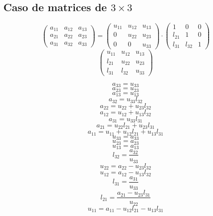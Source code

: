\documentclass[10pt,a4paper,dvipdfmx]{article}
\begin{document}
\subsection{Caso de matrices de $3\times 3$ }
$$ \left( 
\begin{array}{ccc}
a_{{1}{1}} & a_{{1}{2}} & a_{{1}{3}} \\
a_{{2}{1}} & a_{{2}{2}} & a_{{2}{3}} \\
a_{{3}{1}} & a_{{3}{2}} & a_{{3}{3}} 
 \end{array}
\right)
 = \left( 
\begin{array}{ccc}
u_{{1}{1}} & u_{{1}{2}} & u_{{1}{3}} \\
0 & u_{{2}{2}} & u_{{2}{3}} \\
0 & 0 & u_{{3}{3}} 
 \end{array}
\right)
 \cdot \left( 
\begin{array}{ccc}
1 & 0 & 0 \\
l_{{2}{1}} & 1 & 0 \\
l_{{3}{1}} & l_{{3}{2}} & 1 
 \end{array}
\right)
 $$
$$ \left( 
\begin{array}{ccc}
u_{{1}{1}} & u_{{1}{2}} & u_{{1}{3}} \\
l_{{2}{1}} & u_{{2}{2}} & u_{{2}{3}} \\
l_{{3}{1}} & l_{{3}{2}} & u_{{3}{3}} 
 \end{array}
\right)
 $$
\begin{multicols}{2}
$$ a_{{3}{3}} = u_{{3}{3}} $$
$$ a_{{2}{3}} = u_{{2}{3}} $$
$$ a_{{1}{3}} = u_{{1}{3}} $$
$$ a_{{3}{2}} = u_{{3}{3}} l_{{3}{2}} $$
$$ a_{{2}{2}} = u_{{2}{2}} + u_{{2}{3}} l_{{3}{2}} $$
$$ a_{{1}{2}} = u_{{1}{2}} + u_{{1}{3}} l_{{3}{2}} $$
$$ a_{{3}{1}} = u_{{3}{3}} l_{{3}{1}} $$
$$ a_{{2}{1}} = u_{{2}{2}} l_{{2}{1}} + u_{{2}{3}} l_{{3}{1}} $$
$$ a_{{1}{1}} = u_{{1}{1}} + u_{{1}{2}} l_{{2}{1}} + u_{{1}{3}} l_{{3}{1}} $$
\vfill\null
\columnbreak
$$ u_{{3}{3}} = a_{{3}{3}} $$
$$ u_{{2}{3}} = a_{{2}{3}} $$
$$ u_{{1}{3}} = a_{{1}{3}} $$
$$ l_{{3}{2}} = \dfrac{a_{{3}{2}}}{u_{{3}{3}}} $$
$$ u_{{2}{2}} = a_{{2}{2}}- u_{{2}{3}} l_{{3}{2}} $$
$$ u_{{1}{2}} = a_{{1}{2}}- u_{{1}{3}} l_{{3}{2}} $$
$$ l_{{3}{1}} = \dfrac{a_{{3}{1}}}{u_{{3}{3}}} $$
$$ l_{{2}{1}} = \dfrac{a_{{2}{1}}- u_{{2}{3}} l_{{3}{1}}}{u_{{2}{2}}} $$
$$ u_{{1}{1}} = a_{{1}{1}}- u_{{1}{2}} l_{{2}{1}}- u_{{1}{3}} l_{{3}{1}} $$
\end{multicols}
\end{document}
